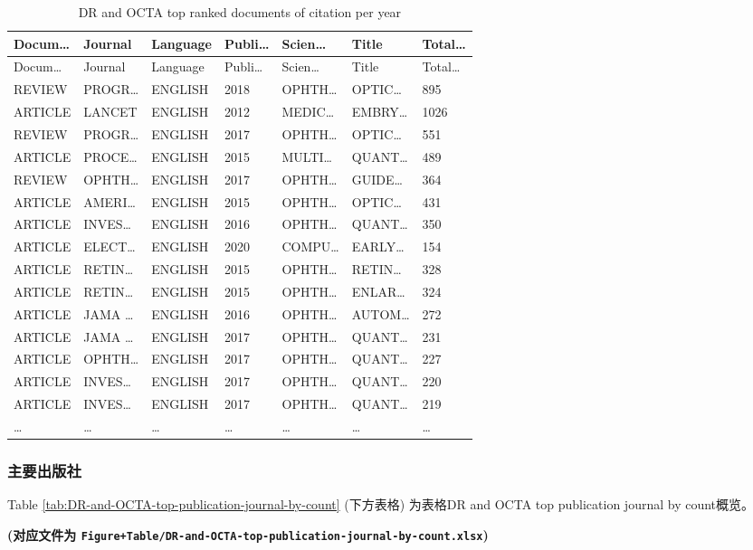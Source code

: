 \documentclass[
]{article}
\begin{document}
\begin{longtable}[]{@{}lllllll@{}}
\caption{\label{tab:DR-and-OCTA-top-ranked-documents-of-citation-per-year}DR and OCTA top ranked documents of citation per year}\tabularnewline
\toprule
Docum\ldots{} & Journal & Language & Publi\ldots{} & Scien\ldots{} & Title & Total\ldots{}\tabularnewline
\midrule
\endfirsthead
\toprule
Docum\ldots{} & Journal & Language & Publi\ldots{} & Scien\ldots{} & Title & Total\ldots{}\tabularnewline
\midrule
\endhead
REVIEW & PROGR\ldots{} & ENGLISH & 2018 & OPHTH\ldots{} & OPTIC\ldots{} & 895\tabularnewline
ARTICLE & LANCET & ENGLISH & 2012 & MEDIC\ldots{} & EMBRY\ldots{} & 1026\tabularnewline
REVIEW & PROGR\ldots{} & ENGLISH & 2017 & OPHTH\ldots{} & OPTIC\ldots{} & 551\tabularnewline
ARTICLE & PROCE\ldots{} & ENGLISH & 2015 & MULTI\ldots{} & QUANT\ldots{} & 489\tabularnewline
REVIEW & OPHTH\ldots{} & ENGLISH & 2017 & OPHTH\ldots{} & GUIDE\ldots{} & 364\tabularnewline
ARTICLE & AMERI\ldots{} & ENGLISH & 2015 & OPHTH\ldots{} & OPTIC\ldots{} & 431\tabularnewline
ARTICLE & INVES\ldots{} & ENGLISH & 2016 & OPHTH\ldots{} & QUANT\ldots{} & 350\tabularnewline
ARTICLE & ELECT\ldots{} & ENGLISH & 2020 & COMPU\ldots{} & EARLY\ldots{} & 154\tabularnewline
ARTICLE & RETIN\ldots{} & ENGLISH & 2015 & OPHTH\ldots{} & RETIN\ldots{} & 328\tabularnewline
ARTICLE & RETIN\ldots{} & ENGLISH & 2015 & OPHTH\ldots{} & ENLAR\ldots{} & 324\tabularnewline
ARTICLE & JAMA \ldots{} & ENGLISH & 2016 & OPHTH\ldots{} & AUTOM\ldots{} & 272\tabularnewline
ARTICLE & JAMA \ldots{} & ENGLISH & 2017 & OPHTH\ldots{} & QUANT\ldots{} & 231\tabularnewline
ARTICLE & OPHTH\ldots{} & ENGLISH & 2017 & OPHTH\ldots{} & QUANT\ldots{} & 227\tabularnewline
ARTICLE & INVES\ldots{} & ENGLISH & 2017 & OPHTH\ldots{} & QUANT\ldots{} & 220\tabularnewline
ARTICLE & INVES\ldots{} & ENGLISH & 2017 & OPHTH\ldots{} & QUANT\ldots{} & 219\tabularnewline
\ldots{} & \ldots{} & \ldots{} & \ldots{} & \ldots{} & \ldots{} & \ldots{}\tabularnewline
\bottomrule
\end{longtable}

\hypertarget{ux4e3bux8981ux51faux7248ux793e}{%
\subsubsection{主要出版社}\label{ux4e3bux8981ux51faux7248ux793e}}

Table \ref{tab:DR-and-OCTA-top-publication-journal-by-count} (下方表格) 为表格DR and OCTA top publication journal by count概览。

\textbf{(对应文件为 \texttt{Figure+Table/DR-and-OCTA-top-publication-journal-by-count.xlsx})}
\end{document}
